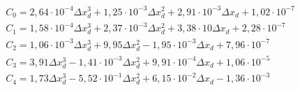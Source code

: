 \begin{eqnarray}
&C_0 =2,64\cdot 10^{-4}\Delta x_d^{3}+1,25\cdot 10^{-3}\Delta x_d^{2}+2,91\cdot 10^{-3}\Delta x_d+1,02\cdot 10^{-7} \\
&C_1 =1,58\cdot 10^{-4}\Delta x_d^{3}+2,37\cdot 10^{-3}\Delta x_d^{2}+3,38\cdot 10\Delta x_d+2,28\cdot 10^{-7} \\     
&C_2 =1,06\cdot 10^{-3}\Delta x_d^{3}+9,95\Delta x_d^{2}-1,95\cdot 10^{-3}\Delta x_d+7,96\cdot 10^{-7} \\             
&C_3 =3,91\Delta x_d^{3}-1,41\cdot 10^{-3}\Delta x_d^{2}+9,91\cdot 10^{-4}\Delta x_d+1,06\cdot 10^{-5} \\             
&C_4 =1,73\Delta x_d^{3}-5,52\cdot 10^{-1}\Delta x_d^{2}+6,15\cdot 10^{-2}\Delta x_d-1,36\cdot 10^{-3} \\           
\end{eqnarray}
%
%
%
%
